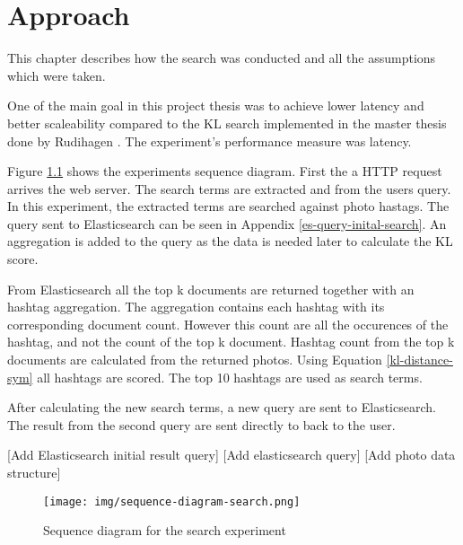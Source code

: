 \chapter{Approach}
\label{ch:approach}
This chapter describes how the search was conducted and all the assumptions which were taken.


One of the main goal in this project thesis was to achieve lower latency and better scaleability compared to the KL search implemented in the master thesis done by Rudihagen \cite{master-thesis}.
The experiment's performance measure was latency.

Figure \ref{fig:sequence-diagram-search} shows the experiments sequence diagram.
First the a HTTP request arrives the web server.
The search terms are extracted and from the users query.
In this experiment, the extracted terms are searched against photo hastags.
The query sent to Elasticsearch can be seen in Appendix \ref{es-query-inital-search}.
An aggregation is added to the query as the data is needed later to calculate the KL score.

From Elasticsearch all the top k documents are returned together with an hashtag aggregation.
The aggregation contains each hashtag with its corresponding document count.
However this count are all the occurences of the hashtag, and not the count of the top k document.
Hashtag count from the top k documents are calculated from the returned photos.
Using Equation \ref{kl-distance-sym} all hashtags are scored.
The top 10 hashtags are used as search terms.

After calculating the new search terms, a new query are sent to Elasticsearch.
The result from the second query are sent directly to back to the user.

[Add Elasticsearch initial result query]
[Add elasticsearch query]
[Add photo data structure]

\begin{figure}[h!]
\centering \texttt{[image: img/sequence-diagram-search.png]}
\caption{Sequence diagram for the search experiment}
\label{fig:sequence-diagram-search}
\end{figure}
